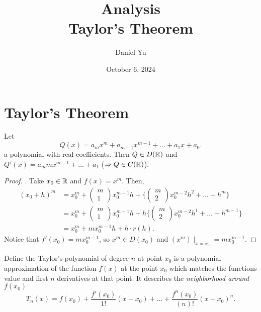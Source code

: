 \documentclass[a4paper]{article}
\title{\Huge{Analysis}\\ Taylor's Theorem}
\author{\huge{Daniel Yu}}
\date{October 6, 2024}
\begin{document}
\maketitle
\newpage%
\tableofcontents
\pagebreak

\section{Taylor's Theorem}
\begin{lemma}
  Let
  \[
  Q(x) = a_{m} x^{m} + a_{m-1}x^{m-1} + \ldots + a_1 x + a_0
  .\] 
  a polynomial with real coefficients. Then $Q \in D(\mathbb{R})$ and $Q'(x) = a_m m x^{m-1} + \ldots + a_1$ ($\Rightarrow Q \in C(\mathbb{R})$).  

  \noindent\hrulefill

  \begin{proof}.
    Take $x_0 \in \mathbb{R}$ and $f(x) = x^{m}$. Then, 
   \begin{align*}
     (x_0 + h)^{m} &= x_0^{m} + \begin{pmatrix} m\\ 1 \end{pmatrix} x_0^{m-1}h +  \{ \begin{pmatrix} m\\ 2 \end{pmatrix}x_0^{m-2} h^{2} + \ldots + h^{m} \}  \\
                   &=  x_0^{m} + \begin{pmatrix} m\\ 1 \end{pmatrix} x_0^{m-1}h +  h \{ \begin{pmatrix} m\\ 2 \end{pmatrix}x_0^{m-2} h^{1} + \ldots + h^{m-1} \}   \\
                   &= x_{0}^{m}  + m x_0^{m-1}h +  h  \cdot r(h) 
   .\end{align*}
    Notice that $f'(x_0) = m x_0^{m-1}$, so $x^{m} \in D(x_0)$ and $(x^{m}) \mid_{x = x_0} = m x_0^{m-1}$.  
      
  \end{proof}
\end{lemma}

\begin{definition}
  Define the Taylor's polynomial of degree $n$ at point  $x_0$ is a polynomial approximation of the function $f(x)$ at the point $x_0$ which matches the functions value and first  $n$ derivatives at that point. It describes the \textit{neighborhood around  $f(x_0)$}
    \[
   T_{n}(x) = f(x_0) + \frac{f'(x_0)}{1!} (x-x_0) + \ldots + \frac{f^{n}( x_0)}{(n)!} (x-x_0)^{n}
   .\] 
\end{definition}
\end{document}
